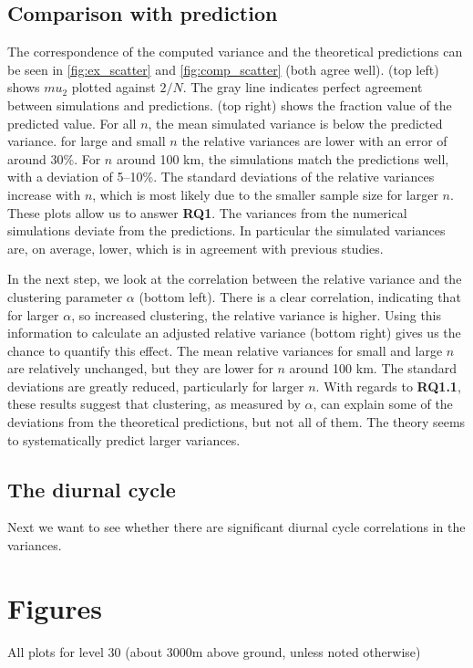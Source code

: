 \documentclass[a4paper, 12pt]{article}
\begin{document}
\subsection{Comparison with prediction}
The correspondence of the computed variance and the theoretical predictions can be seen in \ref{fig:ex_scatter} and \ref{fig:comp_scatter} (both agree well). (top left) shows $mu_2$ plotted against $2/N$. The gray line indicates perfect agreement between simulations and predictions. (top right) shows the fraction value of the predicted value. For all $n$, the mean simulated variance is below the predicted variance. for large and small $n$ the relative variances are lower with an error of around 30\%. For $n$ around 100 km, the simulations match the predictions well, with a deviation of 5--10\%. The standard deviations of the relative variances increase with $n$, which is most likely due to the smaller sample size for larger $n$. These plots allow us to answer \textbf{RQ1}. The variances from the numerical simulations deviate from the predictions. In particular the simulated variances are, on average, lower, which is in agreement with previous studies. 

In the next step, we look at the correlation between the relative variance and the clustering parameter $\alpha$ (bottom left). There is a clear correlation, indicating that for larger $\alpha$, so increased clustering, the relative variance is higher. Using this information to calculate an adjusted relative variance (bottom right) gives us the chance to quantify this effect. The mean relative variances for small and large $n$ are relatively unchanged, but they are lower for $n$ around 100 km. The standard deviations are greatly reduced, particularly for larger $n$. With regards to \textbf{RQ1.1}, these results suggest that clustering, as measured by $\alpha$, can explain some of the deviations from the theoretical predictions, but not all of them. The theory seems to systematically predict larger variances. 

\subsection{The diurnal cycle}
Next we want to see whether there are significant diurnal cycle correlations in the variances. 


\newpage

{\small
 }

\newpage
\section{Figures}
All plots for level 30 (about 3000m above ground, unless noted otherwise)
\end{document}
